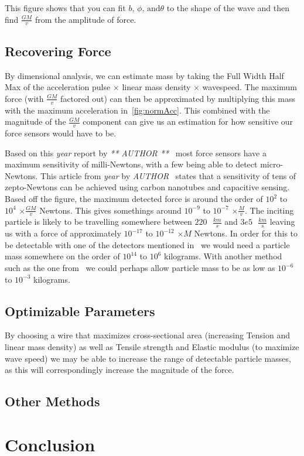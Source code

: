 \documentclass{report}
\begin{document}
This figure shows that you can fit $b \text{, } \phi \text{, and} \theta$ to the shape of the wave and then find $\frac{G M}{v}$ from the amplitude of force.

\section*{Recovering Force}
By dimensional analysis, we can estimate mass by taking the Full Width Half Max of the acceleration pulse $\times$ linear mass density $\times$ wavespeed.
The maximum force (with $\frac{G M}{v}$ factored out) can then be approximated by multiplying this mass with the maximum acceleration in~\ref{fig:normAcc}. This combined with 
the magnitude of the $\frac{G M}{v}$ component can give us an estimation for how sensitive our force sensors would have to be.

Based on this \emph{year} report by \emph{** AUTHOR **}~\cite{WEI2015359} most force sensors have a maximum sensitivity of milli-Newtons, with a few being able to detect micro-Newtons.
This article from \emph{year} by \emph{AUTHOR}~\cite{Moser2013} states that a sensitivity of tens of zepto-Newtons can be achieved using carbon nanotubes and capacitive sensing. 
Based off the figure, the maximum detected force is around the order of $10^2$ to $10^4$ $\times \frac{G M}{v}$ Newtons. This gives somethings around $10^{-9}$ to $10^{-7}$ $\times \frac{M}{v}$. 
The inciting particle is likely to be travelling somewhere between $220 \text{ } \frac{km}{s}$ and $3e5 \text{ } \frac{km}{s}$ leaving us with a force of approximately $10^{-17}$ to $10^{-12}$ $\times M$ Newtons.
In order for this to be detectable with one of the detectors mentioned in~\cite{WEI2015359} we would need a particle mass somewhere on the order of $10^{14}$ to $10^{6}$ kilograms. 
With another method such as the one from~\cite{Moser2013} we could perhaps allow particle mass to be as low as $10^{-6}$ to $10^{-3}$ kilograms. %
\section*{Optimizable Parameters}
By choosing a wire that maximizes cross-sectional area (increasing Tension and linear mass density) as well as Tensile strength and Elastic modulus (to maximize wave speed) we may be able to increase the range of detectable 
particle masses, as this will correspondingly increase the magnitude of the force.
\section*{Other Methods}
\chapter*{Conclusion}
\printbibliography[]
\end{document}
